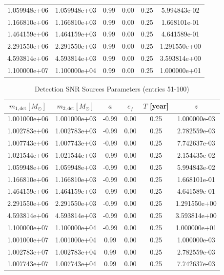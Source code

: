 \documentclass{article}
\begin{document}
\begin{table}[htbp]
\begin{tabular}{cccccc}
1.059948e+06 & 1.059948e+03 & 0.99 & 0.00 & 0.25 & 5.994843e-02 \\
1.166810e+06 & 1.166810e+03 & 0.99 & 0.00 & 0.25 & 1.668101e-01 \\
1.464159e+06 & 1.464159e+03 & 0.99 & 0.00 & 0.25 & 4.641589e-01 \\
2.291550e+06 & 2.291550e+03 & 0.99 & 0.00 & 0.25 & 1.291550e+00 \\
4.593814e+06 & 4.593814e+03 & 0.99 & 0.00 & 0.25 & 3.593814e+00 \\
1.100000e+07 & 1.100000e+04 & 0.99 & 0.00 & 0.25 & 1.000000e+01 \\
\hline
\end{tabular}
\end{table}

\clearpage

\begin{table}[htbp]
\centering
\caption{Detection SNR Sources Parameters (entries 51-100)}
\label{tab:snr_sources_2}
\begin{tabular}{cccccc}
\hline
$m_{1,\mathrm{det}} [M_\odot]$ & $m_{2,\mathrm{det}} [M_\odot]$ & $a$ & $e_f$ & $T$ [year] & $z$ \\
\hline
1.001000e+06 & 1.001000e+03 & -0.99 & 0.00 & 0.25 & 1.000000e-03 \\
1.002783e+06 & 1.002783e+03 & -0.99 & 0.00 & 0.25 & 2.782559e-03 \\
1.007743e+06 & 1.007743e+03 & -0.99 & 0.00 & 0.25 & 7.742637e-03 \\
1.021544e+06 & 1.021544e+03 & -0.99 & 0.00 & 0.25 & 2.154435e-02 \\
1.059948e+06 & 1.059948e+03 & -0.99 & 0.00 & 0.25 & 5.994843e-02 \\
1.166810e+06 & 1.166810e+03 & -0.99 & 0.00 & 0.25 & 1.668101e-01 \\
1.464159e+06 & 1.464159e+03 & -0.99 & 0.00 & 0.25 & 4.641589e-01 \\
2.291550e+06 & 2.291550e+03 & -0.99 & 0.00 & 0.25 & 1.291550e+00 \\
4.593814e+06 & 4.593814e+03 & -0.99 & 0.00 & 0.25 & 3.593814e+00 \\
1.100000e+07 & 1.100000e+04 & -0.99 & 0.00 & 0.25 & 1.000000e+01 \\
1.001000e+07 & 1.001000e+04 & 0.99 & 0.00 & 0.25 & 1.000000e-03 \\
1.002783e+07 & 1.002783e+04 & 0.99 & 0.00 & 0.25 & 2.782559e-03 \\
1.007743e+07 & 1.007743e+04 & 0.99 & 0.00 & 0.25 & 7.742637e-03 \\

\end{tabular}
\end{table}
\end{document}
